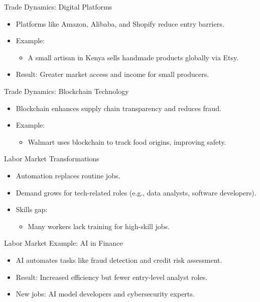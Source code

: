 \documentclass{beamer}
\begin{document}
\begin{frame}{Trade Dynamics: Digital Platforms}
    \begin{itemize}
        \item Platforms like Amazon, Alibaba, and Shopify reduce entry barriers.
        \item Example:
        \begin{itemize}
            \item A small artisan in Kenya sells handmade products globally via Etsy.
        \end{itemize}
        \item Result: Greater market access and income for small producers.
    \end{itemize}
\end{frame}

\begin{frame}{Trade Dynamics: Blockchain Technology}
    \begin{itemize}
        \item Blockchain enhances supply chain transparency and reduces fraud.
        \item Example:
        \begin{itemize}
            \item Walmart uses blockchain to track food origins, improving safety.
        \end{itemize}
    \end{itemize}
\end{frame}

\begin{frame}{Labor Market Transformations}
    \begin{itemize}
        \item Automation replaces routine jobs.
        \item Demand grows for tech-related roles (e.g., data analysts, software developers).
        \item Skills gap:
        \begin{itemize}
            \item Many workers lack training for high-skill jobs.
        \end{itemize}
    \end{itemize}
\end{frame}

\begin{frame}{Labor Market Example: AI in Finance}
    \begin{itemize}
        \item AI automates tasks like fraud detection and credit risk assessment.
        \item Result: Increased efficiency but fewer entry-level analyst roles.
        \item New jobs: AI model developers and cybersecurity experts.
    \end{itemize}
\end{frame}
\end{document}
